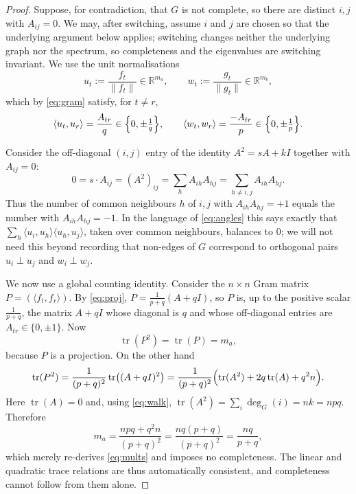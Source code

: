 \documentclass{amsart}
\theoremstyle{definition}
\begin{document}
\begin{proof}
Suppose, for contradiction, that $G$ is not complete, so there are distinct
$i,j$ with $A_{ij}=0$. We may, after switching, assume $i$ and $j$ are chosen
so that the underlying argument below applies; switching changes neither the
underlying graph nor the spectrum, so completeness and the eigenvalues are
switching invariant. We use the unit normalisations
\[
u_t:=\frac{f_t}{\|f_t\|}\in\mathbb R^{m_a},\qquad
w_t:=\frac{g_t}{\|g_t\|}\in\mathbb R^{m_b},
\]
which by \eqref{eq:gram} satisfy, for $t\ne r$,
\begin{equation}\label{eq:angles}
\langle u_t,u_r\rangle=\frac{A_{tr}}{q}\in\Bigl\{0,\pm\tfrac1q\Bigr\},
\qquad
\langle w_t,w_r\rangle=\frac{-A_{tr}}{p}\in\Bigl\{0,\pm\tfrac1p\Bigr\}.
\end{equation}

Consider the off-diagonal $(i,j)$ entry of the identity $A^2=sA+kI$ together
with $A_{ij}=0$:
\[
0=s\cdot A_{ij}=(A^2)_{ij}=\sum_{h}A_{ih}A_{hj}
=\sum_{h\ne i,j}A_{ih}A_{hj}.
\]
Thus the number of common neighbours $h$ of $i,j$ with $A_{ih}A_{hj}=+1$ equals
the number with $A_{ih}A_{hj}=-1$. In the language of \eqref{eq:angles} this
says exactly that $\sum_{h}\langle u_i,u_h\rangle\langle u_h,u_j\rangle$, taken
over common neighbours, balances to $0$; we will not need this beyond recording
that non-edges of $G$ correspond to orthogonal pairs $u_i\perp u_j$ and
$w_i\perp w_j$.

We now use a global counting identity. Consider the $n\times n$ Gram matrix
$P=(\langle f_t,f_r\rangle)$. By \eqref{eq:proj}, $P=\frac1{p+q}(A+qI)$, so
$P$ is, up to the positive scalar $\frac1{p+q}$, the matrix $A+qI$ whose
diagonal is $q$ and whose off-diagonal entries are $A_{tr}\in\{0,\pm1\}$. Now
\[
\operatorname{tr}(P^2)=\operatorname{tr}(P)=m_a,
\]
because $P$ is a projection. On the other hand
\[
\operatorname{tr}(P^2)=\frac{1}{(p+q)^2}\operatorname{tr}\bigl((A+qI)^2\bigr)
=\frac{1}{(p+q)^2}\Bigl(\operatorname{tr}(A^2)+2q\operatorname{tr}(A)
+q^2 n\Bigr).
\]
Here $\operatorname{tr}(A)=0$ and, using \eqref{eq:walk},
$\operatorname{tr}(A^2)=\sum_i\deg_G(i)=nk=npq$. Therefore
\[
m_a=\frac{npq+q^2 n}{(p+q)^2}=\frac{nq(p+q)}{(p+q)^2}=\frac{nq}{p+q},
\]
which merely re-derives \eqref{eq:mults} and imposes no completeness. The
linear and quadratic trace relations are thus automatically consistent, and
completeness cannot follow from them alone.


\end{proof}
\end{document}
